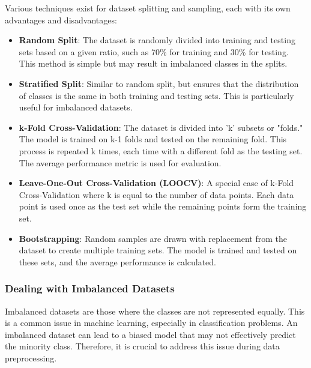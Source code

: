     Various techniques exist for dataset splitting and sampling, each with its own advantages and disadvantages:

    \begin{itemize}
        \item \textbf{Random Split}: The dataset is randomly divided into training and testing sets based on a given ratio, such as 70\% for training and 30\% for testing. This method is simple but may result in imbalanced classes in the splits.
        
        \item \textbf{Stratified Split}: Similar to random split, but ensures that the distribution of classes is the same in both training and testing sets. This is particularly useful for imbalanced datasets.
        
        \item \textbf{k-Fold Cross-Validation}: The dataset is divided into 'k' subsets or "folds." The model is trained on k-1 folds and tested on the remaining fold. This process is repeated k times, each time with a different fold as the testing set. The average performance metric is used for evaluation.
        
        \item \textbf{Leave-One-Out Cross-Validation (LOOCV)}: A special case of k-Fold Cross-Validation where k is equal to the number of data points. Each data point is used once as the test set while the remaining points form the training set.
        
        \item \textbf{Bootstrapping}: Random samples are drawn with replacement from the dataset to create multiple training sets. The model is trained and tested on these sets, and the average performance is calculated.
    \end{itemize}

    \subsubsection{Dealing with Imbalanced Datasets}
    Imbalanced datasets are those where the classes are not represented equally. This is a common issue in machine learning, especially in classification problems. An imbalanced dataset can lead to a biased model that may not effectively predict the minority class. Therefore, it is crucial to address this issue during data preprocessing.

